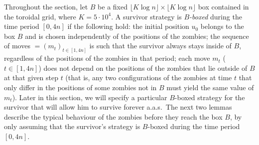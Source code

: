 \documentclass[12pt]{amsart}
\begin{document}
Throughout the section, let $B$ be a fixed $\lfloor K\log n\rfloor \times \lfloor K\log n\rfloor$ box contained in the toroidal grid, where $K= 5 \cdot 10^4$.
A survivor strategy is \emph{$B$-boxed} during the
time period $[0,4n]$ if the following hold: the initial position $u_0$ belongs to the box $B$ and is chosen independently of the positions of the zombies; the sequence of moves
$\bm=(m_t)_{t\in[1,4n]}$ is such that the survivor always stays inside of $B$, regardless of the positions of the zombies in that period; each move $m_t$ ($t\in[1,4n]$) does not depend on the
positions of the zombies that lie outside of $B$ at that given step $t$ (that is, any two configurations of the zombies at time $t$ that only differ in the positions of some zombies not in $B$ must
yield the same value of $m_t$). Later in this section, we will specify a particular $B$-boxed strategy for the survivor that will allow him to survive forever a.a.s.\ The next two lemmas describe the typical behaviour of the zombies before they reach the box $B$, by only assuming that the survivor's strategy is $B$-boxed during the time period $[0,4n]$.
\end{document}
